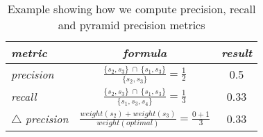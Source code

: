 
\begin{table}[h!]
\caption{Example showing how we compute precision, recall and pyramid precision metrics}
\label{tbl:metrics-example}
\centering    
\begin{small}
\begin{threeparttable}
\begin{tabular}{lcc}

\textit{metric} & \textit{formula} & \textit{result} \\ 
\hline

\textit{precision} & \parbox[c][.9cm][c]{4cm}{\centering $\frac{\{s_2, s_3\}~ \cap ~\{s_1, s_3\}}{\{s_2, s_3\}} = \frac{1}{2}$} & 0.5 
\\


\textit{recall}  & \parbox[c][.9cm][c]{4cm}{\centering $\frac{\{s_2, s_3\}~ \cap ~\{s_1, s_3\}}{\{s_1, s_3,  s_4\}} = \frac{1}{3}$}  & 0.33 
\\

$\triangle$ \textit{precision}  & \parbox[c][.9cm][c]{4cm}{\centering $\frac{weight(s_2) + weight(s_3)}{weight(optimal)} = \frac{0 + 1}{3} $}  & 0.33 
\\

\end{tabular}
\end{threeparttable}
\end{small}
\end{table}



